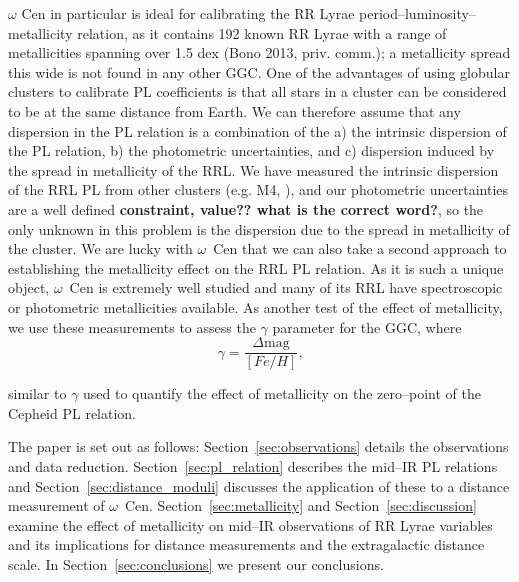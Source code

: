 \documentclass[a4paper,fleqn,usenatbib]{mnras}
\begin{document}
$\omega$ Cen in particular is ideal for calibrating the RR Lyrae period--luminosity--metallicity relation, as it contains 192 known RR Lyrae \citep{2004A&A...424.1101K} with a range of metallicities spanning over 1.5 dex (Bono 2013, priv. comm.); a metallicity spread this wide is not found in any other GGC. One of the advantages of using globular clusters to calibrate PL coefficients is that all stars in a cluster can be considered to be at the same distance from Earth. We can therefore assume that any dispersion in the PL relation is a combination of the a) the intrinsic dispersion of the PL relation, b) the photometric uncertainties, and c) dispersion induced by the spread in metallicity of the RRL. We have measured the intrinsic dispersion of the RRL PL from other clusters (e.g. M4, \citet{2015arXiv150507858N}), and our photometric uncertainties are a well defined \textbf{constraint, value?? what is the correct word?}, so the only unknown in this problem is the dispersion due to the spread in metallicity of the cluster. We are lucky with $\omega$~Cen that we can also take a second approach to establishing the metallicity effect on the RRL PL relation. As it is such a unique object, $\omega$~Cen is extremely well studied and many of its RRL have spectroscopic or photometric metallicities available. As another test of the effect of metallicity, we use these measurements to assess the $\gamma$ parameter for the GGC, where 
\begin{equation} \label{eqn:gamma}
\gamma = \dfrac {\Delta \text{mag}} {[Fe/H]}\text{,}
\end{equation}

similar to $\gamma$ used to quantify the effect of metallicity on the zero--point of the Cepheid PL relation. 

The paper is set out as follows: Section~\ref{sec:observations} details the observations and data reduction. Section~\ref{sec:pl_relation} describes the mid--IR PL relations and Section~\ref{sec:distance_moduli} discusses the application of these to a distance measurement of  $\omega$~Cen. Section~\ref{sec:metallicity} and Section~\ref{sec:discussion} examine the effect of metallicity on mid--IR observations of RR Lyrae variables and its implications for distance measurements and the extragalactic distance scale. In Section~\ref{sec:conclusions} we present our conclusions.
\end{document}
